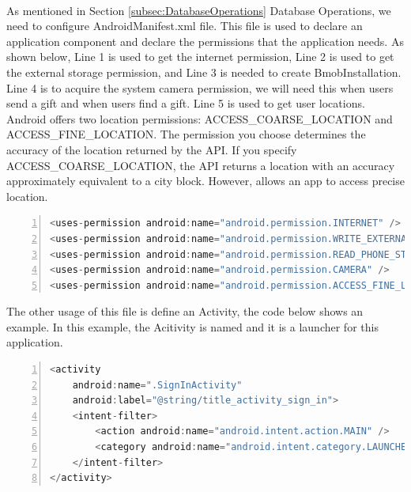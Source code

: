 \paragraph{} As mentioned in Section \ref{subsec:DatabaseOperations} Database Operations, we need to configure AndroidManifest.xml file. This file is used to declare an application component and declare the permissions that the application needs. As shown below, Line 1 is used to get the internet permission, Line 2 is used to get the external storage permission, and Line 3 is needed to create BmobInstallation. Line 4 is to acquire the system camera permission, we will need this when users send a gift and when users find a gift. Line 5 is used to get user locations. Android offers two location permissions: ACCESS\_COARSE\_LOCATION and ACCESS\_FINE\_LOCATION. The permission you choose determines the accuracy of the location returned by the API. If you specify ACCESS\_COARSE\_LOCATION, the API returns a location with an accuracy approximately equivalent to a city block. However,  allows an app to access precise location.
\begin{lstlisting}[caption={Get System Permissions},language={java},
        numbers=left,basicstyle=\footnotesize\ttfamily,breaklines=true,xleftmargin=.05\textwidth, xrightmargin=.05\textwidth] 
<uses-permission android:name="android.permission.INTERNET" />
<uses-permission android:name="android.permission.WRITE_EXTERNAL_STORAGE" />
<uses-permission android:name="android.permission.READ_PHONE_STATE" />
<uses-permission android:name="android.permission.CAMERA" />
<uses-permission android:name="android.permission.ACCESS_FINE_LOCATION" />
\end{lstlisting} 
\par The other usage of this file is define an Activity, the code below shows an example. In this example, the Acitivity is named  and it is a launcher for this application.
\begin{lstlisting}[caption={Define Activities},language={java},
        numbers=left,basicstyle=\footnotesize\ttfamily,breaklines=true,xleftmargin=.05\textwidth, xrightmargin=.05\textwidth] 
<activity
    android:name=".SignInActivity"
    android:label="@string/title_activity_sign_in">
    <intent-filter>
        <action android:name="android.intent.action.MAIN" />
        <category android:name="android.intent.category.LAUNCHER" />
    </intent-filter>
</activity>
\end{lstlisting} 

